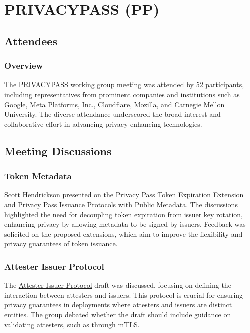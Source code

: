 \documentclass{article}
\begin{document}
\newpage

\section{PRIVACYPASS (PP)}

\subsection{Attendees}
\subsubsection{Overview}
The PRIVACYPASS working group meeting was attended by 52 participants, including representatives from prominent companies and institutions such as Google, Meta Platforms, Inc., Cloudflare, Mozilla, and Carnegie Mellon University. The diverse attendance underscored the broad interest and collaborative effort in advancing privacy-enhancing technologies.

\subsection{Meeting Discussions}
\subsubsection{Token Metadata}
Scott Hendrickson presented on the \href{https://datatracker.ietf.org/doc/draft-hendrickson-privacypass-expiration-extension/}{Privacy Pass Token Expiration Extension} and \href{https://datatracker.ietf.org/doc/draft-ietf-privacypass-public-metadata-issuance/}{Privacy Pass Issuance Protocols with Public Metadata}. The discussions highlighted the need for decoupling token expiration from issuer key rotation, enhancing privacy by allowing metadata to be signed by issuers. Feedback was solicited on the proposed extensions, which aim to improve the flexibility and privacy guarantees of token issuance.

\subsubsection{Attester Issuer Protocol}
The \href{https://datatracker.ietf.org/doc/draft-hendrickson-pp-attesterissuer/}{Attester Issuer Protocol} draft was discussed, focusing on defining the interaction between attesters and issuers. This protocol is crucial for ensuring privacy guarantees in deployments where attesters and issuers are distinct entities. The group debated whether the draft should include guidance on validating attesters, such as through mTLS.
\end{document}
